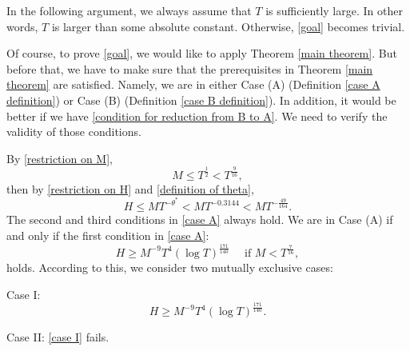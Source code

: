 \documentclass[11pt]{amsart}
\numberwithin{equation}{section}
\theoremstyle{definition}
\theoremstyle{proposition}
\begin{document}
In the following argument, we always assume that $T$ is sufficiently large. In other words, $T$ is larger than some absolute constant. Otherwise, \eqref{goal} becomes trivial. 

Of course, to prove \eqref{goal}, we would like to apply Theorem \ref{main theorem}. But before that, we have to make sure that the prerequisites in Theorem \ref{main theorem} are satisfied. Namely, we are in either Case (A) (Definition \ref{case A definition}) or Case (B) (Definition \ref{case B definition}). In addition, it would be better if we have \eqref{condition for reduction from B to A}. We need to verify the validity of those conditions. 

By \eqref{restriction on M}, 
\[
M\le T^{\frac{1}{2}} < T^{\frac{9}{16}}, 
\]
then by \eqref{restriction on H} and \eqref{definition of theta}, 
\[
H\le MT^{-\theta^*}< MT^{-0.3144}<MT^{-\frac{49}{164}}.
\]
The second and third conditions in \eqref{case A} always hold. We are in Case (A) if and only if the first condition in \eqref{case A}: 
\begin{equation}  \label{1st condition in case A}
H\ge M^{-9}T^4 (\log T)^{\frac{171}{140}}  \quad \text{ if } M<T^{\frac{7}{16}},     
\end{equation}
holds. According to this, we consider two mutually exclusive cases:

Case I:
\begin{equation}  \label{case I}
H\ge M^{-9}T^4 (\log T)^{\frac{171}{140}}.
\end{equation}

Case II: \eqref{case I} fails. 
\end{document}
